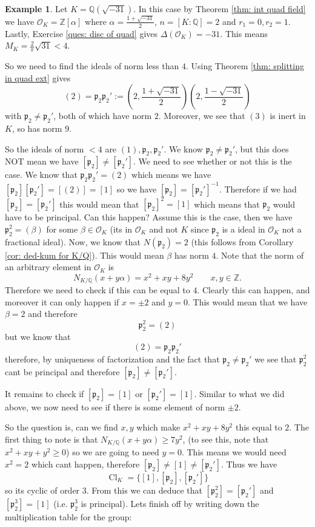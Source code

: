 \documentclass[11pt,a4paper]{report}
\theoremstyle{plain}
\theoremstyle{definition}
\newtheorem{exmp}[subsection]{Example}
\theoremstyle{definition}
\newcommand{\ZZ}{\mathbb{Z}}
\def\QQ{\mathbb{Q}}
\def\gothp{\mathfrak{p}}
\def \a{\alpha}
\def \OO {\mathcal{O}}
\DeclareMathOperator{\Cl}{Cl}
\begin{document}
\begin{exmp}
	Let $K=\QQ(\sqrt{-31})$. In this case by Theorem \ref{thm: int quad field} we have $\OO_K=\ZZ[\a]$ where $\a=\frac{1+\sqrt{-31}}{2}$, $n=[K:\QQ]=2$ and $r_1=0,r_2=1$. Lastly, Exercise \ref{ques: disc of quad} gives $\Delta(\OO_K)=-31$. This means $M_K=\frac{2}{\pi}\sqrt{31} < 4$.
	
	So we need to find the ideals of norm less than $4$. Using Theorem \ref{thm: splitting in quad ext} gives \[(2)=\gothp_2\gothp_2':=(2,\frac{1+\sqrt{-31}}{2})(2,\frac{1-\sqrt{-31}}{2})\] with $\gothp_2 \neq \gothp_2'$, both of which have norm $2$. Moreover, we see that $(3)$ is inert in $K$, so has norm $9$.
	
	So the ideals of norm $<4$ are $(1),\gothp_2,\gothp_{2}'$. We know $\gothp_2 \neq \gothp_2'$, but this does NOT mean we have $[\gothp_2] \neq [\gothp_2']$. We need to see whether or not this is the case. We know that $\gothp_2\gothp_2'=(2)$ which means we have $[\gothp_2][\gothp_2']=[(2)]=[1]$ so we have $[\gothp_2]=[\gothp_2']^{-1}$. Therefore if we had $[\gothp_2] = [\gothp_2']$ this would mean that $[\gothp_2]^2=[1]$ which means that $\gothp_2$ would have to be principal. Can this happen? Assume this is the case, then we have $\gothp_2^2=(\beta)$ for some $\beta \in \OO_K$ (its in $\OO_K$ and not $K$ since $\gothp_2$ is a ideal in $\OO_K$ not a fractional ideal). Now, we know that $N(\gothp_2)=2$ (this follows from Corollary \ref{cor: ded-kum for K/Q}). This would mean $\beta$ has norm $4$. Note that the norm of an arbitrary element in $\OO_K$ is  \[N_{K/\QQ}(x+y \a)=x^2+xy+8y^2 \qquad x,y \in \ZZ.\] Therefore we need to check if this can be equal to $4$. Clearly this can happen, and moreover it can only happen if $x=\pm 2$ and $y=0$. This would mean that we have $\beta=2$ and therefore \[\gothp_2^2=(2)\] but we know that \[(2)=\gothp_2\gothp_2'\] therefore, by uniqueness of factorization and the fact that $\gothp_2 \neq \gothp_2'$ we see that $\gothp_2^2$ cant be principal and therefore $[\gothp_2] \neq [\gothp_2']$.
	
	
	
	It remains to check if $[\gothp_2]=[1]$ or $[\gothp_2']=[1]$. Similar to what we did above, we now need to see if there is some element of norm $\pm 2$.
	
	So the question is, can we find $x,y$ which make $x^2+xy+8y^2$ this equal to $2$. The first thing to note is that $N_{K/\QQ}(x+y\a) \geq 7y^2$, (to see this, note that $x^2+xy+y^2 \geq 0$) so we are going to need $y=0$. This means we would need $x^2=2$ which cant happen, therefore $[\gothp_2] \neq [1] \neq [\gothp_2']$. Thus we have \[\Cl_K=\{[1],[\gothp_2],[\gothp_2']\}\] so its cyclic of order $3$. From this we can deduce that $[\gothp_2^2]=[\gothp_2']$ and $[\gothp_2^3]=[1]$ (i.e. $\gothp_2^3$ is principal). Lets finish off by writing down the multiplication table for the group:
	

\end{exmp}
\end{document}
